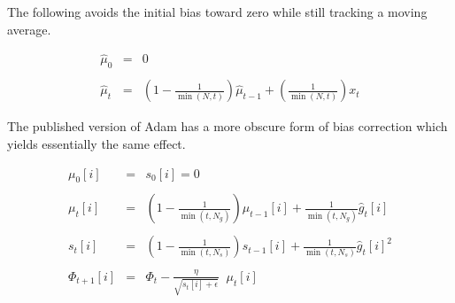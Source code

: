 {The following avoids the initial bias toward zero while still tracking a moving average.

\begin{eqnarray*}
\hat{\mu}_0 & = & 0 \\
\\
\hat{\mu}_t & = & \left(1-\frac{1}{\min(N,t)}\right)\hat{\mu}_{t-1} + \left(\frac{1}{\min(N,t)}\right)x_t
\end{eqnarray*}

\vfill
The published version of Adam has a more obscure form of bias correction which yields essentially the same effect.


\begin{eqnarray*}
  \mu_0[i] & = & s_0[i] = 0 \\
  \\
  \mu_{t}[i] & = & \left(1-\frac{1}{\min(t,N_g)}\right)\mu_{t-1}[i] + \frac{1}{\min(t,N_g)} \hat{g}_t[i] \\
  \\
  s_{t}[i] & = & \left(1-\frac{1}{\min(t,N_s)}\right)s_{t-1}[i] + \frac{1}{\min(t,N_s)} \hat{g}_t[i]^2 \\
  \\
\Phi_{t+1}[i] & =  & \Phi_t - \frac{\eta}{\sqrt{s_{t}[i] + \epsilon}}\;\;\mu_{t}[i]
\end{eqnarray*}

} 

